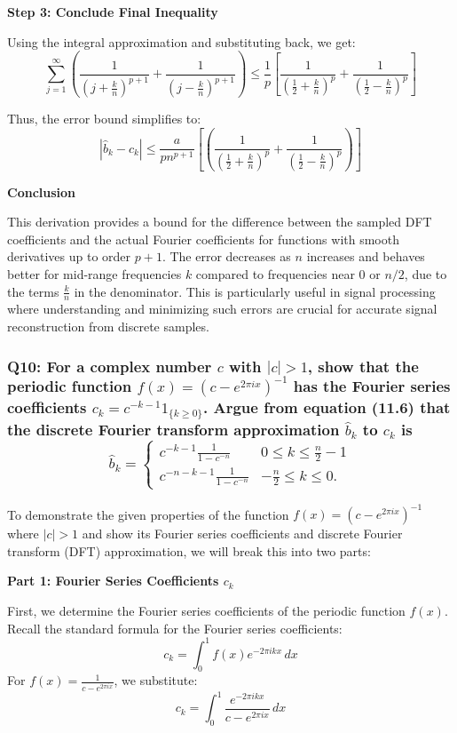\documentclass[8pt]{article}
\begin{document}
{\textbf{Step 3: Conclude Final Inequality}

Using the integral approximation and substituting back, we get:
\[ \sum_{j=1}^\infty \left( \frac{1}{(j + \frac{k}{n})^{p+1}} + \frac{1}{(j - \frac{k}{n})^{p+1}} \right) \leq \frac{1}{p} \left[ \frac{1}{\left(\frac{1}{2} + \frac{k}{n}\right)^p} + \frac{1}{\left(\frac{1}{2} - \frac{k}{n}\right)^p} \right] \]

Thus, the error bound simplifies to:
\[
|\hat{b}_k - c_k| \leq \frac{a}{pn^{p+1}} \left[ \left( \frac{1}{\left( \frac{1}{2} + \frac{k}{n} \right)^p} + \frac{1}{\left( \frac{1}{2} - \frac{k}{n} \right)^p} \right) \right]
\]


\textbf{Conclusion}

This derivation provides a bound for the difference between the sampled DFT coefficients and the actual Fourier coefficients for functions with smooth derivatives up to order \(p+1\). The error decreases as \(n\) increases and behaves better for mid-range frequencies \(k\) compared to frequencies near \(0\) or \(n/2\), due to the terms \(\frac{k}{n}\) in the denominator. This is particularly useful in signal processing where understanding and minimizing such errors are crucial for accurate signal reconstruction from discrete samples.

\subsubsection*{Q10:
For a complex number \(c\) with \(|c| > 1\), show that the periodic function \(f(x) = (c - e^{2\pi ix})^{-1}\) has the Fourier series coefficients \(c_k = c^{-k-1}1_{\{k \geq 0\}}\). Argue from equation (11.6) that the discrete Fourier transform approximation \(\hat{b}_k\) to \(c_k\) is
\[
\hat{b}_k = \begin{cases}
c^{-k-1} \frac{1}{1 - c^{-n}} & 0 \leq k \leq \frac{n}{2} - 1 \\
c^{-n-k-1} \frac{1}{1 - c^{-n}} & -\frac{n}{2} \leq k \leq 0.
\end{cases}
\]}

To demonstrate the given properties of the function \(f(x) = (c - e^{2\pi ix})^{-1}\) where \(|c| > 1\) and show its Fourier series coefficients and discrete Fourier transform (DFT) approximation, we will break this into two parts:

\textbf{Part 1: Fourier Series Coefficients \(c_k\)}

First, we determine the Fourier series coefficients of the periodic function \(f(x)\). Recall the standard formula for the Fourier series coefficients:
\[
c_k = \int_0^1 f(x) e^{-2\pi i k x} \, dx
\]
For \(f(x) = \frac{1}{c - e^{2\pi ix}}\), we substitute:
\[
c_k = \int_0^1 \frac{e^{-2\pi i k x}}{c - e^{2\pi ix}} \, dx
\]

}
\end{document}
